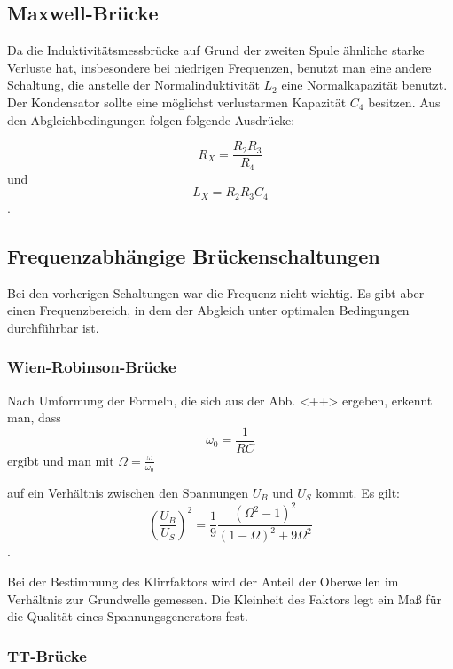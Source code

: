 \subsection{Maxwell-Brücke}

Da die Induktivitätsmessbrücke auf Grund der zweiten Spule ähnliche starke Verluste hat, insbesondere bei niedrigen Frequenzen, benutzt man eine andere Schaltung, die anstelle der Normalinduktivität $L_2$ eine Normalkapazität benutzt. Der Kondensator sollte eine möglichst verlustarmen Kapazität $C_4$ besitzen. 
Aus den Abgleichbedingungen folgen folgende Ausdrücke:

\begin{equation}
     R_X = \frac{R_2R_3}{R_4}
\end{equation}
und 
\begin{equation}
    L_X = R_2R_3C_4
\end{equation}.

\subsection{Frequenzabhängige Brückenschaltungen}

Bei den vorherigen Schaltungen war die Frequenz nicht wichtig. Es gibt aber einen Frequenzbereich, in dem der Abgleich unter optimalen Bedingungen durchführbar ist.

\subsubsection{Wien-Robinson-Brücke}

Nach Umformung der Formeln, die sich aus der Abb. <++> ergeben, erkennt man, dass 
\begin{equation}
    \omega_0 = \frac{1}{RC}
\end{equation} ergibt und man mit $\Omega = \frac{\omega}{\omega_0}$ 

auf ein Verhältnis zwischen den Spannungen $U_B$ und $U_S$ kommt. 
Es gilt:
\begin{equation}
    (\frac{U_B}{U_S})^2 = \frac{1}{9} \frac{(\Omega^2 -1)^2}{(1- \Omega)^2 + 9 \Omega^2}
\end{equation}.

Bei der Bestimmung des Klirrfaktors wird der Anteil der Oberwellen im Verhältnis zur Grundwelle gemessen. 
Die Kleinheit des Faktors legt ein Maß für die Qualität eines Spannungsgenerators fest. 

\subsubsection{TT-Brücke}

